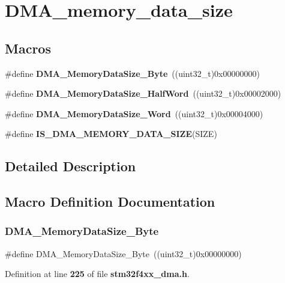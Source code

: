 \section{D\+M\+A\+\_\+memory\+\_\+data\+\_\+size}
\label{group__DMA__memory__data__size}
\subsection*{Macros}
\begin{DoxyCompactItemize}
\item 
\#define \textbf{ D\+M\+A\+\_\+\+Memory\+Data\+Size\+\_\+\+Byte}~((uint32\+\_\+t)0x00000000)
\item 
\#define \textbf{ D\+M\+A\+\_\+\+Memory\+Data\+Size\+\_\+\+Half\+Word}~((uint32\+\_\+t)0x00002000)
\item 
\#define \textbf{ D\+M\+A\+\_\+\+Memory\+Data\+Size\+\_\+\+Word}~((uint32\+\_\+t)0x00004000)
\item 
\#define \textbf{ I\+S\+\_\+\+D\+M\+A\+\_\+\+M\+E\+M\+O\+R\+Y\+\_\+\+D\+A\+T\+A\+\_\+\+S\+I\+ZE}(S\+I\+ZE)
\end{DoxyCompactItemize}


\subsection{Detailed Description}


\subsection{Macro Definition Documentation}
\mbox{\label{group__DMA__memory__data__size_gad6093bccb60ff9adf81e21c73c58ba17}} 
\subsubsection{D\+M\+A\+\_\+\+Memory\+Data\+Size\+\_\+\+Byte}
{\footnotesize\ttfamily \#define D\+M\+A\+\_\+\+Memory\+Data\+Size\+\_\+\+Byte~((uint32\+\_\+t)0x00000000)}



Definition at line \textbf{ 225} of file \textbf{ stm32f4xx\+\_\+dma.\+h}.

